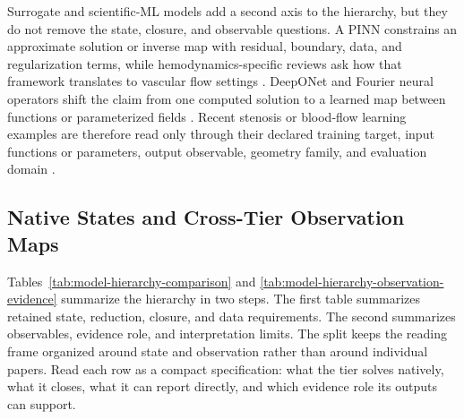 Surrogate and scientific-ML models add a second axis to the hierarchy, but they
do not remove the state, closure, and observable questions. A PINN constrains an
approximate solution or inverse map with residual, boundary, data, and
regularization terms, while hemodynamics-specific reviews ask how that framework
translates to vascular flow settings
\cite{RaissiEtAl2019PhysicsInformedNeuralNetworks,YuEtAl2026PINNHemodynamicsReview}.
DeepONet and Fourier neural operators shift the claim from one computed
solution to a learned map between functions or parameterized fields
\cite{LuEtAl2021DeepONet,LiEtAl2021FNO}. Recent stenosis or blood-flow learning
examples are therefore read only through their declared training target,
input functions or parameters, output observable, geometry family, and
evaluation domain
\cite{CsalaEtAl2025PCNDE,VelikorodnyEtAl2025DeepOperatorStenosed}.

\subsection{Native States and Cross-Tier Observation Maps}
\label{subsec:native-states-observation-maps}

Tables~\ref{tab:model-hierarchy-comparison} and
\ref{tab:model-hierarchy-observation-evidence} summarize the hierarchy in two
steps. The first table summarizes retained state, reduction, closure, and data
requirements. The second summarizes observables, evidence role, and
interpretation limits. The split keeps the reading frame organized around
state and observation rather than around individual papers. Read each row as a
compact specification: what the tier solves natively, what it closes, what it
can report directly, and which evidence role its outputs can support.

